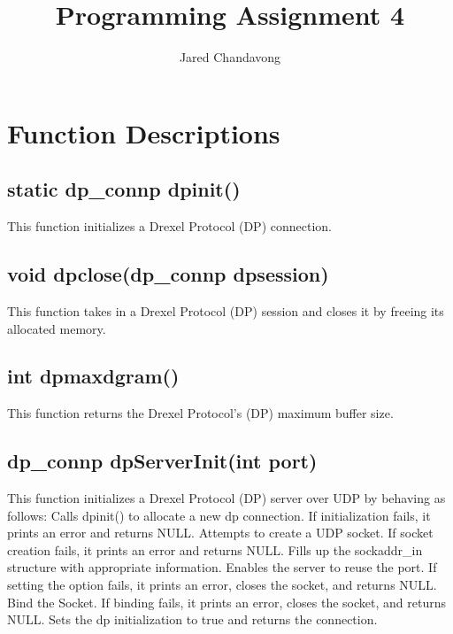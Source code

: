 \documentclass[12pt, a4paper]{article}
\title{Programming Assignment 4}
\author{Jared Chandavong}
\begin{document}
\maketitle

\newpage
{\selectfont
\section{Function Descriptions}

\subsection{static dp\_connp dpinit()}
This function initializes a Drexel Protocol (DP) connection.

\subsection{void dpclose(dp\_connp dpsession)}
This function takes in a Drexel Protocol (DP) session and closes it by freeing its allocated memory.

\subsection{int dpmaxdgram()}
This function returns the Drexel Protocol's (DP) maximum buffer size. 

\subsection{dp\_connp dpServerInit(int port)}
This function initializes a Drexel Protocol (DP) server over UDP by behaving as follows: \newline
\indent Calls dpinit() to allocate a new dp connection. If initialization fails, it \newline 
\indent\indent prints an error and returns NULL. \newline
\indent Attempts to create a UDP socket. If socket creation fails, it prints an \newline
\indent\indent error and returns NULL. \newline
\indent Fills up the sockaddr\_in structure with appropriate information. \newline
\indent Enables the server to reuse the port. If setting the option fails, it prints \newline
\indent\indent an error, closes the socket, and returns NULL. \newline
\indent Bind the Socket. If binding fails, it prints an error, closes the socket, and \newline
\indent\indent returns NULL. \newline
\indent Sets the dp initialization to true and returns the connection.

}
\end{document}
